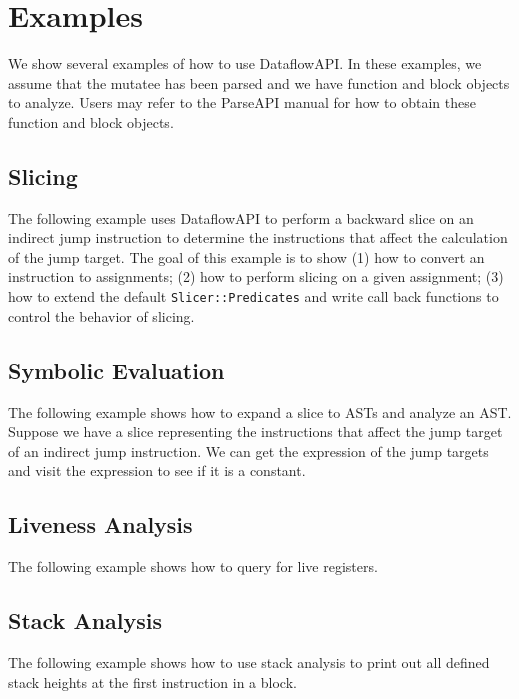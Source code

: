 \section{Examples}
\label{sec:examples}
We show several examples of how to use DataflowAPI. In these examples, we assume
that the mutatee has been parsed and we have function and block objects to analyze.
Users may refer to the ParseAPI manual for how to obtain these function and block objects.

\subsection{Slicing}
The following example uses DataflowAPI to perform a backward slice on an
indirect jump instruction to determine the instructions that affect the
calculation of the jump target. The goal of this example is to show (1) how to
convert an instruction to assignments; (2) how to perform slicing on a given
assignment; (3) how to extend the default \texttt{Slicer::Predicates} and write
call back functions to control the behavior of slicing.




\subsection{Symbolic Evaluation}
The following example shows how to expand a slice to ASTs and analyze an AST.
Suppose we have a slice representing the instructions that affect the jump
target of an indirect jump instruction.
We can get the expression of the jump targets and visit the expression to see if it
is a constant.



\subsection{Liveness Analysis}
The following example shows how to query for live registers.



\subsection{Stack Analysis}
The following example shows how to use stack analysis to print out all defined stack heights at the first instruction in a block.



